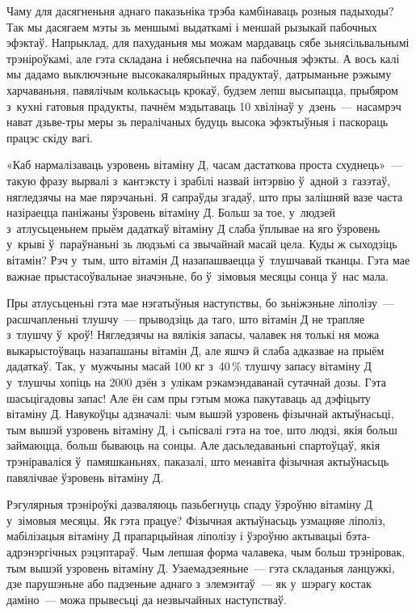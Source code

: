 Чаму для дасягненьня аднаго паказьніка трэба камбінаваць розныя падыходы? Так мы дасягаем мэты зь меншымі выдаткамі і меншай рызыкай пабочных эфэктаў. Напрыклад, для пахуданьня мы можам мардаваць сябе зьнясільвальнымі трэніроўкамі, але гэта складана і небясьпечна на пабочныя эфэкты. А вось калі мы дадамо выключэньне высокакалярыйных прадуктаў, датрыманьне рэжыму харчаваньня, павялічым колькасьць крокаў, будзем лепш высыпацца, прыбяром з~кухні гатовыя прадукты, пачнём мэдытаваць 10 хвілінаў у~дзень~--- насамрэч нават дзьве-тры меры зь пералічаных будуць высока эфэктыўныя і паскораць працэс скіду вагі.

«Каб нармалізаваць узровень вітаміну Д, часам дастаткова проста схуднець»~--- такую фразу вырвалі з~кантэксту і зрабілі назвай інтэрвію ў~адной з~газэтаў, нягледзячы на мае пярэчаньні. Я сапраўды згадаў, што пры залішняй вазе часта назіраецца паніжаны ўзровень вітаміну Д. Больш за тое, у~людзей з~атлусьценьнем прыём дадаткаў вітаміну Д слаба ўплывае на яго ўзровень у~крыві ў~параўнаньні зь людзьмі са звычайнай масай цела. Куды ж сыходзіць вітамін? Рэч у~тым, што вітамін Д назапашваецца ў~тлушчавай тканцы. Гэта мае важнае прыстасоўвальнае значэньне, бо ў~зімовыя месяцы сонца ў~нас мала.

Пры атлусьценьні гэта мае нэгатыўныя наступствы, бо зьніжэньне ліполізу~--- расшчапленьні тлушчу~--- прыводзіць да таго, што вітамін Д не трапляе з~тлушчу ў~кроў! Нягледзячы на вялікія запасы, чалавек ня толькі ня можа выкарыстоўваць назапашаны вітамін Д, але яшчэ й слаба адказвае на прыём дадаткаў. Так, у~мужчыны масай 100 кг з~40\,\% тлушчу запасу вітаміну Д у~тлушчы хопіць на 2000 дзён з~улікам рэкамэндаванай сутачнай дозы. Гэта шасьцігадовы запас! Але ён сам пры гэтым можа пакутаваць ад дэфіцыту вітаміну Д. Навукоўцы адзначалі: чым вышэй узровень фізычнай актыўнасьці, тым вышэй узровень вітаміну Д, і сьпісвалі гэта на тое, што людзі, якія больш займаюцца, больш бываюць на сонцы. Але дасьледаваньні спартоўцаў, якія трэніраваліся ў~памяшканьнях, паказалі, што менавіта фізычная актыўнасьць павялічвае ўзровень вітаміну Д.

Рэгулярныя трэніроўкі дазваляюць пазьбегнуць спаду ўзроўню вітаміну Д у~зімовыя месяцы. Як гэта працуе? Фізычная актыўнасьць узмацняе ліполіз, мабілізацыя вітаміну Д прапарцыйная ліполізу і ўзроўню актывацыі бэта-адрэнэргічных рэцэптараў. Чым лепшая форма чалавека, чым больш трэніровак, тым вышэй узровень вітаміну Д. Узаемадзеяньне~--- гэта складаныя ланцужкі, дзе парушэньне або падзеньне аднаго з~элемэнтаў~--- як у~шэрагу костак даміно~--- можа прывесьці да незвычайных наступстваў.

